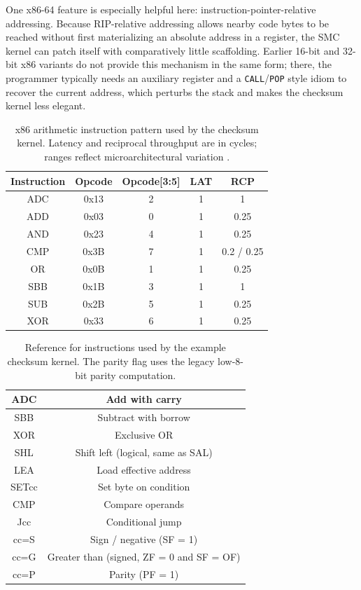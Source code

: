 \documentclass[11pt]{article}
\begin{document}
One x86-64 feature is especially helpful here: instruction-pointer-relative
addressing.  Because RIP-relative addressing allows nearby code bytes to be
reached without first materializing an absolute address in a register, the SMC
kernel can patch itself with comparatively little scaffolding.  Earlier 16-bit
and 32-bit x86 variants do not provide this mechanism in the same form; there,
the programmer typically needs an auxiliary register and a \texttt{CALL}/\texttt{POP}
style idiom to recover the current address, which perturbs the stack and makes
the checksum kernel less elegant.

\begin{table}[t]
\centering
\small
\begin{tabular}{|c|c|c|c|c|}
\hline
\textbf{Instruction} & \textbf{Opcode} & \textbf{Opcode[3:5]} & \textbf{LAT} & \textbf{RCP} \\ \hline
ADC & 0x13 & 2 & 1 & 1 \\ \hline
ADD & 0x03 & 0 & 1 & 0.25 \\ \hline
AND & 0x23 & 4 & 1 & 0.25 \\ \hline
CMP & 0x3B & 7 & 1 & 0.2 / 0.25 \\ \hline
OR  & 0x0B & 1 & 1 & 0.25 \\ \hline
SBB & 0x1B & 3 & 1 & 1 \\ \hline
SUB & 0x2B & 5 & 1 & 0.25 \\ \hline
XOR & 0x33 & 6 & 1 & 0.25 \\ \hline
\end{tabular}
\caption{x86 arithmetic instruction pattern used by the checksum kernel.  Latency and reciprocal throughput are in cycles; ranges reflect microarchitectural variation \cite{asmjitAsmGrid}.}
\label{tbl:instgroup}
\end{table}

\begin{table}[t]
\centering
\small
\begin{tabular}{|c|c|}
\hline
ADC & Add with carry \\ \hline
SBB & Subtract with borrow \\ \hline
XOR & Exclusive OR \\ \hline
SHL & Shift left (logical, same as SAL) \\ \hline
LEA & Load effective address \\ \hline
SETcc & Set byte on condition \\ \hline
CMP & Compare operands \\ \hline
Jcc & Conditional jump \\ \hline
cc=S & Sign / negative (SF = 1) \\ \hline
cc=G & Greater than (signed, ZF = 0 and SF = OF) \\ \hline
cc=P & Parity (PF = 1) \\ \hline
\end{tabular}
\caption{Reference for instructions used by the example checksum kernel.  The parity flag uses the legacy low-8-bit parity computation.}
\label{tbl:instinfo}
\end{table}
\end{document}
